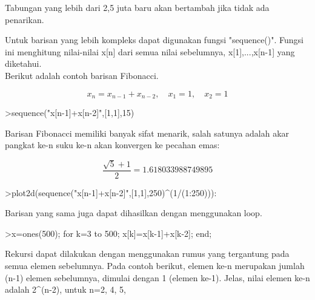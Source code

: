 \documentclass[a4paper,10pt]{article}
\begin{document}
\begin{eulernotebook}
\begin{eulercomment}
\begin{eulercomment}
\begin{eulercomment}
\begin{eulercomment}
\begin{eulercomment}
\begin{eulercomment}
\begin{eulercomment}
\begin{eulercomment}
\begin{eulercomment}
\begin{eulercomment}
\begin{eulercomment}
\begin{eulercomment}
\begin{eulercomment}
\begin{eulercomment}
\begin{eulercomment}
\begin{eulercomment}
\begin{eulercomment}
\begin{eulercomment}
\begin{eulercomment}
\begin{eulercomment}
\begin{eulercomment}
Tabungan yang lebih dari 2,5 juta baru akan bertambah jika tidak ada penarikan.

Untuk barisan yang lebih kompleks dapat digunakan fungsi "sequence()". Fungsi ini menghitung
nilai-nilai x[n] dari semua nilai sebelumnya, x[1],...,x[n-1] yang diketahui.\\
Berikut adalah contoh barisan Fibonacci.

\end{eulercomment}
\begin{eulerformula}
\[
x_n = x_{n-1}+x_{n-2}, \quad x_1=1, \quad x_2 =1
\]
\end{eulerformula}
\begin{eulerprompt}
>sequence("x[n-1]+x[n-2]",[1,1],15)
\end{eulerprompt}
\begin{euleroutput}
  [1,  1,  2,  3,  5,  8,  13,  21,  34,  55,  89,  144,  233,  377,  610]
\end{euleroutput}
\begin{eulercomment}
Barisan Fibonacci memiliki banyak sifat menarik, salah satunya adalah akar pangkat ke-n suku
ke-n akan konvergen ke pecahan emas:
\end{eulercomment}
\begin{eulerformula}
\[
\frac{\sqrt{5}+1}{2}=1.618033988749895
\]
\end{eulerformula}
\begin{eulerprompt}
>plot2d(sequence("x[n-1]+x[n-2]",[1,1],250)^(1/(1:250))):
\end{eulerprompt}
\begin{eulercomment}
Barisan yang sama juga dapat dihasilkan dengan menggunakan loop.
\end{eulercomment}
\begin{eulerprompt}
>x=ones(500); for k=3 to 500; x[k]=x[k-1]+x[k-2]; end;
\end{eulerprompt}
\begin{eulercomment}
Rekursi dapat dilakukan dengan menggunakan rumus yang tergantung pada semua elemen
sebelumnya. Pada contoh berikut, elemen ke-n merupakan jumlah (n-1) elemen sebelumnya,
dimulai dengan 1 (elemen ke-1). Jelas, nilai elemen ke-n adalah 2\textasciicircum{}(n-2), untuk n=2, 4, 5,

\end{eulercomment}
\end{eulercomment}
\end{eulercomment}
\end{eulercomment}
\end{eulercomment}
\end{eulercomment}
\end{eulercomment}
\end{eulercomment}
\end{eulercomment}
\end{eulercomment}
\end{eulercomment}
\end{eulercomment}
\end{eulercomment}
\end{eulercomment}
\end{eulercomment}
\end{eulercomment}
\end{eulercomment}
\end{eulercomment}
\end{eulercomment}
\end{eulercomment}
\end{eulercomment}
\end{eulernotebook}
\end{document}
